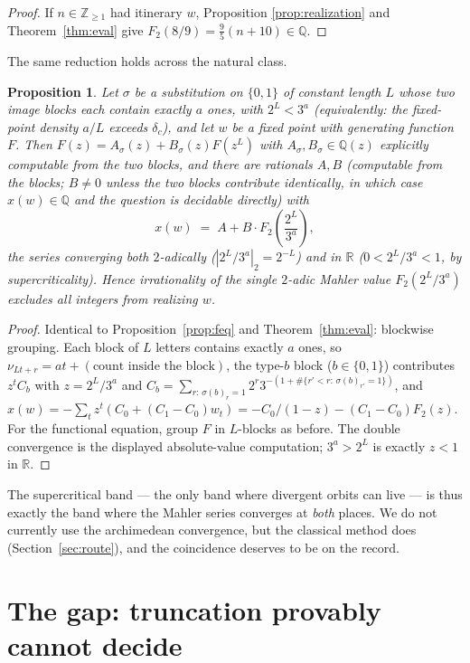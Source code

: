 \documentclass[11pt]{article}
\newtheorem{proposition}[theorem]{Proposition}
\theoremstyle{definition}
\newcommand{\Z}{\mathbb{Z}}
\newcommand{\Q}{\mathbb{Q}}
\newcommand{\R}{\mathbb{R}}
\begin{document}
\begin{proof}
If $n \in \Z_{\ge1}$ had itinerary $w$, Proposition
\ref{prop:realization} and Theorem~\ref{thm:eval} give
$F_2(8/9) = \tfrac95(n + 10) \in \Q$.
\end{proof}

The same reduction holds across the natural class.

\begin{proposition}\label{prop:class}
Let $\sigma$ be a substitution on $\{0,1\}$ of constant length $L$
whose two image blocks each contain exactly $a$ ones, with
$2^L < 3^a$ (equivalently: the fixed-point density $a/L$ exceeds
$\delta_c$), and let $w$ be a fixed point with generating function
$F$. Then $F(z) = A_\sigma(z) + B_\sigma(z) F(z^L)$ with
$A_\sigma, B_\sigma \in \Q(z)$ explicitly computable from the two
blocks, and there are rationals $A, B$ (computable from the blocks;
$B \neq 0$ unless the two blocks contribute identically, in which case
$x(w) \in \Q$ and the question is decidable directly) with
\[
x(w) \;=\; A + B \cdot F_2\!\left(\frac{2^L}{3^a}\right),
\]
the series converging both $2$-adically
($|2^L/3^a|_2 = 2^{-L}$) and in $\R$ ($0 < 2^L/3^a < 1$, by
supercriticality). Hence irrationality of the single $2$-adic Mahler
value $F_2(2^L/3^a)$ excludes all integers from realizing $w$.
\end{proposition}

\begin{proof}
Identical to Proposition~\ref{prop:feq} and Theorem~\ref{thm:eval}:
blockwise grouping. Each block of $L$ letters contains exactly $a$
ones, so $\nu_{Lt + r} = at + (\text{count inside the block})$, the
type-$b$ block ($b \in \{0,1\}$) contributes
$z^t C_b$ with $z = 2^L/3^a$ and
$C_b = \sum_{r:\, \sigma(b)_r = 1} 2^r 3^{-(1 + \#\{r' < r:\,
\sigma(b)_{r'} = 1\})}$, and
$x(w) = -\sum_t z^t (C_0 + (C_1 - C_0) w_t)
= -C_0/(1 - z) - (C_1 - C_0) F_2(z)$.
For the functional equation, group $F$ in $L$-blocks as before. The
double convergence is the displayed absolute-value computation;
$3^a > 2^L$ is exactly $z < 1$ in $\R$.
\end{proof}

The supercritical band --- the only band where divergent orbits can
live --- is thus exactly the band where the Mahler series converges at
\emph{both} places. We do not currently use the archimedean
convergence, but the classical method does (Section~\ref{sec:route}),
and the coincidence deserves to be on the record.

\section{The gap: truncation provably cannot decide}\label{sec:gap}
\end{document}
